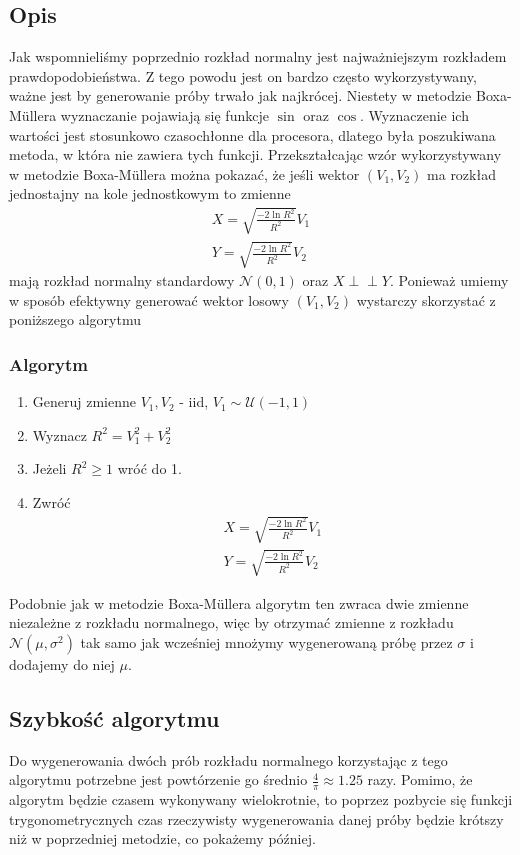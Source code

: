 \documentclass[12pt]{mwrep}
\newcommand{\indep}{\perp \!\!\! \perp}
\begin{document}
	\subsection{Opis}
	Jak wspomnieliśmy poprzednio rozkład normalny jest najważniejszym rozkładem prawdopodobieństwa. Z tego powodu jest on bardzo często wykorzystywany, ważne jest by generowanie próby trwało jak najkrócej. Niestety w metodzie Boxa-M{\"u}llera wyznaczanie pojawiają się funkcje $\sin$ oraz $\cos$. Wyznaczenie ich wartości jest stosunkowo czasochłonne dla procesora, dlatego była poszukiwana metoda, w która nie zawiera tych funkcji. Przekształcając wzór wykorzystywany w metodzie Boxa-M\"ullera można pokazać, że jeśli wektor $(V_1, V_2)$ ma rozkład jednostajny na kole jednostkowym to zmienne
	\begin{equation}
		\begin{split}
			X=\sqrt{\frac{-2\ln R^2}{R^2}}V_1\\
			Y=\sqrt{\frac{-2\ln R^2}{R^2}}V_2
		\end{split}
	\end{equation}
	mają rozkład normalny standardowy $\mathcal{N}(0,1)$ oraz $X \indep Y$. Ponieważ umiemy w sposób efektywny generować wektor losowy $(V_1, V_2)$ wystarczy skorzystać z poniższego algorytmu
	\subsubsection{Algorytm}
	\begin{enumerate}[leftmargin=10mm]
		\item Generuj zmienne $V_1, V_2$ - iid, $V_1\sim\mathcal{U}(-1,1)$
		\item Wyznacz $R^2=V_1^2+V_2^2$
		\item Jeżeli $R^2\ge 1$ wróć do 1.
		\item Zwróć
		\begin{equation}
			\begin{split}
				X=\sqrt{\frac{-2\ln R^2}{R^2}}V_1\\
				Y=\sqrt{\frac{-2\ln R^2}{R^2}}V_2
			\end{split}
		\end{equation}
	\end{enumerate}
	Podobnie jak w metodzie Boxa-M{\"u}llera algorytm ten zwraca dwie zmienne niezależne z rozkładu normalnego, więc by otrzymać zmienne z rozkładu $\mathcal{N}(\mu,\sigma^2)$ tak samo jak wcześniej mnożymy wygenerowaną próbę przez $\sigma$ i dodajemy do niej $\mu$.
	
	\subsection{Szybkość algorytmu}
	Do wygenerowania dwóch prób rozkładu normalnego korzystając z tego algorytmu potrzebne jest powtórzenie go średnio $\frac{4}{\pi}\approx1.25$ razy. Pomimo, że algorytm będzie czasem wykonywany wielokrotnie, to poprzez pozbycie się funkcji trygonometrycznych czas rzeczywisty wygenerowania danej próby będzie krótszy niż w poprzedniej metodzie, co pokażemy później.
	
\end{document}
